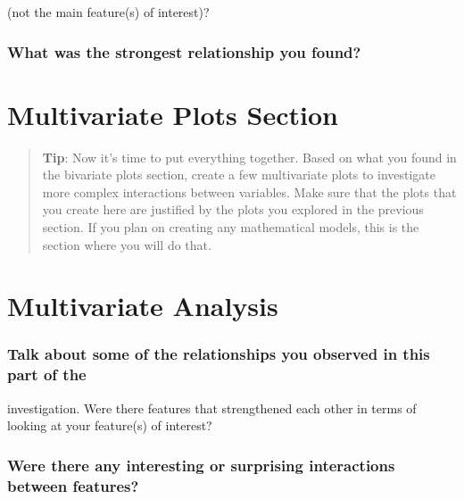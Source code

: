 \documentclass[]{article}
\begin{document}
(not the main feature(s) of interest)?

\hypertarget{what-was-the-strongest-relationship-you-found}{%
\subsubsection{What was the strongest relationship you
found?}\label{what-was-the-strongest-relationship-you-found}}

\hypertarget{multivariate-plots-section}{%
\section{Multivariate Plots Section}\label{multivariate-plots-section}}

\begin{quote}
\textbf{Tip}: Now it's time to put everything together. Based on what
you found in the bivariate plots section, create a few multivariate
plots to investigate more complex interactions between variables. Make
sure that the plots that you create here are justified by the plots you
explored in the previous section. If you plan on creating any
mathematical models, this is the section where you will do that.
\end{quote}

\hypertarget{multivariate-analysis}{%
\section{Multivariate Analysis}\label{multivariate-analysis}}

\hypertarget{talk-about-some-of-the-relationships-you-observed-in-this-part-of-the-1}{%
\subsubsection{\texorpdfstring{Talk about some of the relationships you
observed in this part of the\\
}{Talk about some of the relationships you observed in this part of the }}\label{talk-about-some-of-the-relationships-you-observed-in-this-part-of-the-1}}

investigation. Were there features that strengthened each other in terms
of\\
looking at your feature(s) of interest?

\hypertarget{were-there-any-interesting-or-surprising-interactions-between-features}{%
\subsubsection{Were there any interesting or surprising interactions
between
features?}\label{were-there-any-interesting-or-surprising-interactions-between-features}}
\end{document}
